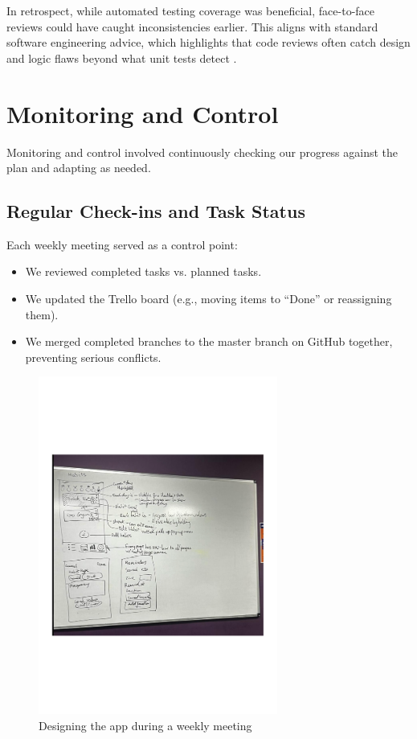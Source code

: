 In retrospect, while automated testing coverage was beneficial, face-to-face reviews could have caught inconsistencies earlier. This aligns with standard software engineering advice, which highlights that code reviews often catch design and logic flaws beyond what unit tests detect \cite{wiegers2002peer}.

\section{Monitoring and Control}
Monitoring and control involved continuously checking our progress against the plan and adapting as needed.

\subsection{Regular Check-ins and Task Status}
Each weekly meeting served as a control point:
\begin{itemize}
    \item We reviewed completed tasks vs. planned tasks.
    \item We updated the Trello board (e.g., moving items to “Done” or reassigning them).
    \item We merged completed branches to the master branch on GitHub together, preventing serious conflicts.
\end{itemize}

\begin{figure}[H]
    \centering
    \includegraphics[width=0.7\textwidth]{resources/board.pdf}
    \caption{Designing the app during a weekly meeting}
    \label{fig:whiteboard_meeting}
\end{figure}

